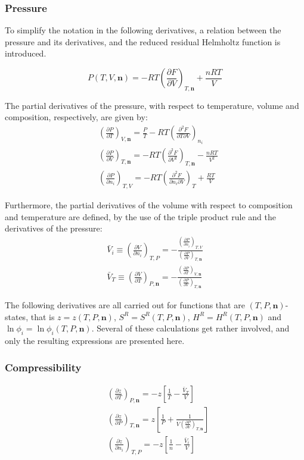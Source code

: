 \documentclass[internal,english]{sintefmemo2012}
\newcommand*{\pder}[2]{\left(\frac{\partial #1}{\partial #2}\right)}
\newcommand*{\pdder}[2]{\left(\frac{\partial^2 #1}{\partial #2^2}\right)}
\newcommand*{\pdcross}[3]{\left(\frac{\partial^2 #1}{\partial #2 \partial #3}\right)}
\numberwithin{equation}{section}
\begin{document}
\subsubsection*{Pressure}
To simplify the notation in the following derivatives, a relation
between the pressure and its derivatives, and the reduced residual
Helmholtz function is introduced.

\begin{equation}
  \label{def:P}
  P(T,V,\textbf{n}) = -RT \left( \frac{\partial F}{\partial V} \right)_{T, \textbf{n}} + \frac{nRT}{V}
\end{equation}

The partial derivatives of the pressure, with respect to temperature,
volume and composition, respectively, are given by:
\begin{align}
  \label{eq:P_T}
  & \pder{P}{T}_{V, \textbf{n}} = \frac{P}{T} - RT \pdcross{F}{T}{V}_{n_i} \\
  \label{eq:P_V}
  & \pder{P}{V}_{T, \textbf{n}} = -RT \pdder{F}{V}_{T, \textbf{n}} - \frac{nRT}{V^2} \\
  \label{eq:P_i}
  & \pder{P}{n_i}_{T,V} = -RT \pdcross{F}{n_i}{V}_T + \frac{RT}{V}
\end{align}

Furthermore, the partial derivatives of the volume with respect to
composition and temperature are defined, by the use of the triple
product rule and the derivatives of the pressure:
\begin{align}
  \label{def:V_i}
  \bar{V}_i \equiv \pder{V}{n_i}_{T,P} =  - \frac{\pder{P}{n_i}_{T,V}}{\pder{P}{V}_{T,\textbf{n}}} \\
  \label{def:V_T}
  \bar{V}_T \equiv \pder{V}{T}_{P,\textbf{n}} = -
  \frac{\pder{P}{T}_{V,\textbf{n}}}{\pder{P}{V}_{T,\textbf{n}}}
\end{align}

The following derivatives are all carried out for functions that are
$(T,P,\textbf{n})$-states, that is $z = z(T,P,\textbf{n})$, $S^R =
S^R(T,P,\textbf{n})$, $H^R = H^R(T,P,\textbf{n})$ and $\ln \phi_i =
\ln \phi_i(T,P,\textbf{n})$. Several of these calculations get rather
involved, and only the resulting expressions are presented here.

\subsubsection*{Compressibility}
\begin{align}
  \label{eq:z_T}
  & \left( \frac{\partial z}{\partial T} \right)_{P, \textbf{n}} = -z\left[\frac{1}{T} - \frac{\bar{V}_T}{V}\right] \\
  \label{eq:z_P}
  & \left( \frac{\partial z}{\partial P} \right)_{T, \textbf{n}} = z \left[ \frac{1}{P} + \frac{1}{V \pder{P}{V}_{T,\textbf{n}}} \right] \\
  \label{eq:z_i}
  & \left( \frac{\partial z}{\partial n_i} \right)_{T,P} = - z \left[
    \frac{1}{n} - \frac{\bar{V}_i}{V} \right]
\end{align}
\end{document}
